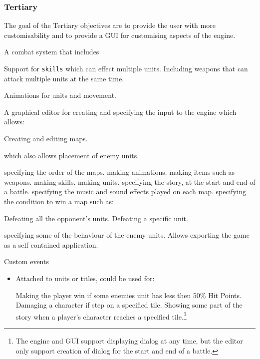 \subsubsection{Tertiary} 
\label{tertiary}
The goal of the Tertiary objectives are to provide the user with more customisability and to provide a GUI for customising aspects of the engine. 

\begin{itemize}
	
	\tick A combat system that includes 
	\begin{itemize}
		\tick Support for \texttt{skills} which can effect multiple units.
		\tick Including weapons that can attack multiple units at the same time. 
	\end{itemize}
	
	\tick Animations for units and movement.
	
	\tick A graphical editor for  creating and specifying the input to the engine which allows:
	\begin{itemize}
		\tick   Creating and editing maps.
		\begin{itemize}
			\tick which also allows placement of enemy units.
		\end{itemize}
		
		\tick   specifying the order of the maps.
		\tick   making animations.
		\tick   making items such as weapons.
		\tick   making skills. 
		\tick   making units.
		\tick   specifying the story, at the start and end of a battle.
		\tick   specifying the music and sound effects played on each map.
		\tick   specifying the condition to win a map such as:
		 \begin{itemize}
		 	\tick Defeating all the opponent's units.
		 	\tick Defeating a specific unit.
		 \end{itemize}
		\tick   specifying some of the behaviour of the enemy units.
		\tick   Allows exporting the game as a self contained application.
	\end{itemize}
	
	\cross Custom events
	\begin{itemize}
		\item Attached to units or titles, could be used for:
		\begin{itemize}
			\partly Making the player win if some enemies unit has less then 50\% Hit Points.
			\cross Damaging a character if step on a specified tile.
			\partly Showing some part of the story when a player's character reaches a specified tile.\footnote{The engine and GUI support displaying dialog at any time, but the editor only support creation of dialog for the start and end of a battle.}
		\end{itemize}
	\end{itemize}
	
\end{itemize}